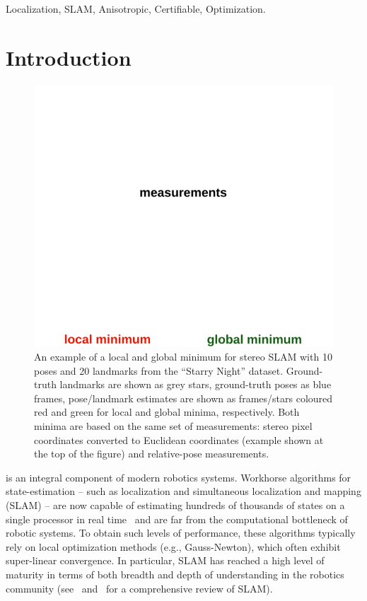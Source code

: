 \documentclass[lettersize,journal]{IEEEtran}
\begin{document}
\begin{IEEEkeywords}
	Localization, SLAM, Anisotropic, Certifiable, Optimization.
\end{IEEEkeywords}

\section{Introduction}
\begin{figure}[!t]
	\centering
	\vspace*{-0.05in}
	\includegraphics[width=\columnwidth]{figs/slam_local_min}
	\vspace*{-0.3in}
	\caption{An example of a local and global minimum for stereo SLAM with 10 poses and 20 landmarks from the ``Starry Night'' dataset. Ground-truth landmarks are shown as grey stars, ground-truth poses as blue frames, pose/landmark estimates are shown as frames/stars coloured red and green for local and global minima, respectively. 
	Both minima are based on the same set of measurements: stereo pixel coordinates converted to Euclidean coordinates (example shown at the top of the figure) and relative-pose measurements.
	}
	\vspace*{-0.22in}
	\label{fig:slam_local_min}
\end{figure}

 is an integral component of modern robotics systems. Workhorse algorithms for state-estimation -- such as localization and simultaneous localization and mapping (SLAM) -- are now capable of estimating hundreds of thousands of states on a single processor in real time~\cite{rosenAdvancesInferenceRepresentation2021} and are far from the computational bottleneck of robotic systems. To obtain such levels of performance, these algorithms typically rely on local optimization methods (e.g., Gauss-Newton), which often exhibit super-linear convergence. In particular, SLAM has reached a high level of maturity in terms of both breadth and depth of understanding in the robotics community (see~\cite{baileySimultaneousLocalizationMapping2006} and~\cite{durrant-whyteSimultaneousLocalizationMapping2006} for a comprehensive review of SLAM).  
\end{document}
